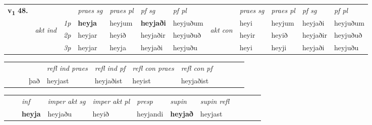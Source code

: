 \begin{tabular}{llllllllllll} \toprule
\multirow{4}{*}{{{\textbf{v{\textsubscript{1}}} \Large{\textbf{48.}}}}}  & &   &  \textit{praes sg}  & \textit{praes pl}  &\textit{ pf sg} & \textit{pf pl} &  &  \textit{praes sg}  & \textit{praes pl}  & \textit{pf sg} & \textit{pf pl } \\*
	\cmidrule{4-7} \cmidrule{9-12}
 & \multirow{3}{*}{\begin{turn}{90}\textit{akt ind}\end{turn}} & {\textit{1p}} & \textbf{heyja} & heyjum    & \textbf{heyjaði} & heyjuðum & \multirow{3}{*}{\begin{turn}{90}\textit{akt con}\end{turn}} &heyi & heyjum & heyjaði & heyjuðum\\*
& &  {\textit{2p}} &  heyjar  & heyið   & heyjaðir & heyjuðuð & & heyir & heyið & heyjaðir & heyjuðuð \\*
& &  {\textit{3p}} & heyjar & heyja   & heyjaði & heyjuðu & & heyi & heyji& heyjaði & heyjuðu  \\*
\cmidrule{4-7} \cmidrule{9-12}
\end{tabular}


\begin{tabular}{llllllllllll}
 & &  & &  \textit{refl ind praes} & \textit{refl ind pf} & \textit{refl con praes} & \textit{refl con pf} \\*
 & &  & það & heyjast & heyjaðist & heyist & heyjaðist \\*
\cmidrule{5-9}
\end{tabular}


\begin{tabular}{llllllllllll}
 & & \textit{inf} & \textit{imper akt sg} & \textit{imper akt pl}   & \textit{presp} & \textit{supin} & \textit{supin refl}      \\*
  & & \textbf{heyja} & heyjaðu  & heyið   & heyjandi &  \textbf{heyjað} & heyjast  \\*
\cmidrule{1-12}
\end{tabular}



